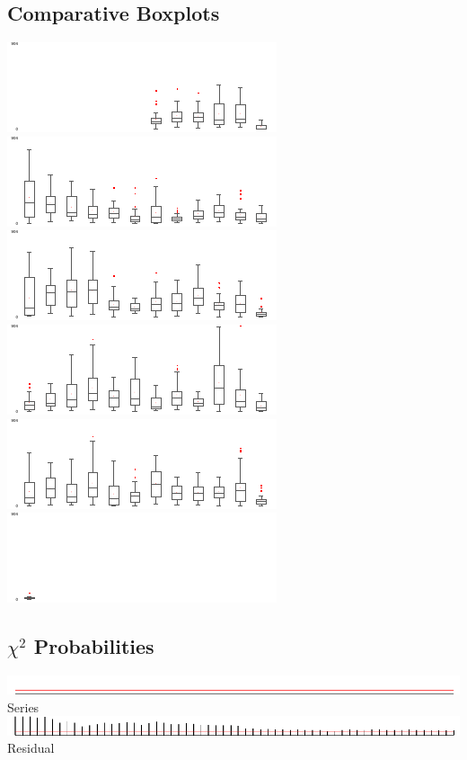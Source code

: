 \documentclass[10pt]{sugconf-ish}
\begin{document}
\subsection{Comparative Boxplots}
\includegraphics{sparkbox_actual2002}\includegraphics{sparkbox_actual2003}\includegraphics{sparkbox_actual2004}\\
\includegraphics{sparkbox_actual2005}\includegraphics{sparkbox_actual2006}\includegraphics{sparkbox_actual2007}\\

\subsection{$\chi^2$ Probabilities}
\includegraphics{spark_probchisq_id_.pdf} Series\\
\includegraphics{spark_probchisq_res_.pdf} Residual\\
\end{document}
